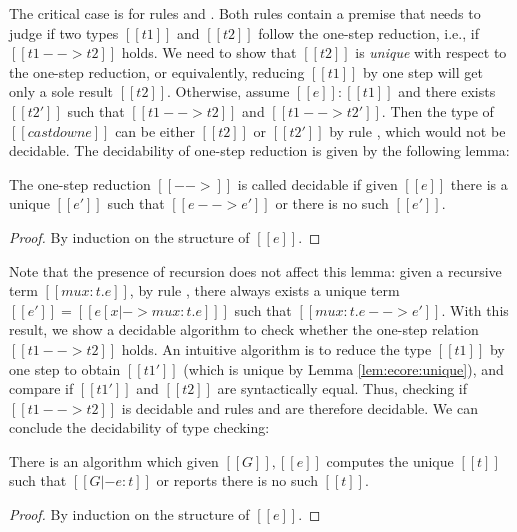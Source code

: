 The critical case is for rules  and
.  Both rules contain a premise that needs to
judge if two types $[[t1]]$ and $[[t2]]$ follow the one-step
reduction, i.e., if $[[t1 --> t2]]$ holds. We need to show that
$[[t2]]$ is \emph{unique} with respect to the one-step reduction, or
equivalently, reducing $[[t1]]$ by one step will get only a sole
result $[[t2]]$. Otherwise, assume $[[e]]:[[t1]]$ and there exists
$[[t2']]$ such that $[[t1 --> t2]]$ and $[[t1 --> t2']]$. Then the
type of $[[castdown e]]$ can be either $[[t2]]$ or $[[t2']]$ by rule
, which would not be decidable. The decidability
of one-step reduction is
given by the following lemma:

\begin{lemma}\label{lem:ecore:unique}
	The one-step reduction $[[-->]]$ is called decidable if 
given $[[e]]$ there is a unique $[[e']]$ such that $[[e --> e']]$ or
there is no such $[[e']]$.
\end{lemma}

\begin{proof}
	By induction on the structure of $[[e]]$.
\end{proof}

Note that the presence of recursion does not affect this lemma: 
given a recursive term
$[[mu x:t.e]]$, by rule , there always exists a unique
term $[[e']]=[[e[x|->mu x:t.e] ]]$ such that $[[mu x:t.e -->
    e']]$.
With this result, we show a decidable algorithm to check whether
the one-step relation $[[t1 --> t2]]$ holds. An intuitive algorithm is to
reduce the type $[[t1]]$ by one step to obtain $[[t1']]$ (which is
unique by Lemma \ref{lem:ecore:unique}), and compare if $[[t1']]$ and
$[[t2]]$ are syntactically equal. Thus, checking if $[[t1 --> t2]]$ is
decidable and rules  and  are
therefore decidable. We can conclude the decidability of type
checking:

\begin{theorem}\label{lem:ecore:decide}
	There is an algorithm which given $[[G]], [[e]]$ computes the unique
$[[t]]$ such that $[[G |- e:t]]$ or reports there is no such $[[t]]$.
\end{theorem}

\begin{proof}
	By induction on the structure of $[[e]]$.
\end{proof}

